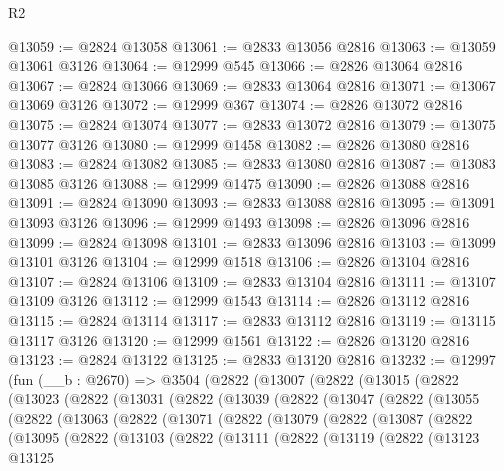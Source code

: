 \begin{lexlean}{R2}
\begin{coremodule}
@13059 := @2824 @13058
@13061 := @2833 @13056 @2816
@13063 := @13059 @13061 @3126
@13064 := @12999 @545
@13066 := @2826 @13064 @2816
@13067 := @2824 @13066
@13069 := @2833 @13064 @2816
@13071 := @13067 @13069 @3126
@13072 := @12999 @367
@13074 := @2826 @13072 @2816
@13075 := @2824 @13074
@13077 := @2833 @13072 @2816
@13079 := @13075 @13077 @3126
@13080 := @12999 @1458
@13082 := @2826 @13080 @2816
@13083 := @2824 @13082
@13085 := @2833 @13080 @2816
@13087 := @13083 @13085 @3126
@13088 := @12999 @1475
@13090 := @2826 @13088 @2816
@13091 := @2824 @13090
@13093 := @2833 @13088 @2816
@13095 := @13091 @13093 @3126
@13096 := @12999 @1493
@13098 := @2826 @13096 @2816
@13099 := @2824 @13098
@13101 := @2833 @13096 @2816
@13103 := @13099 @13101 @3126
@13104 := @12999 @1518
@13106 := @2826 @13104 @2816
@13107 := @2824 @13106
@13109 := @2833 @13104 @2816
@13111 := @13107 @13109 @3126
@13112 := @12999 @1543
@13114 := @2826 @13112 @2816
@13115 := @2824 @13114
@13117 := @2833 @13112 @2816
@13119 := @13115 @13117 @3126
@13120 := @12999 @1561
@13122 := @2826 @13120 @2816
@13123 := @2824 @13122
@13125 := @2833 @13120 @2816
@13232 := @12997
    (fun (__b : @2670) =>
    @3504
      (@2822
        (@13007
          (@2822
            (@13015
              (@2822
                (@13023
                  (@2822
                    (@13031
                      (@2822
                        (@13039
                          (@2822
                            (@13047
                              (@2822
                                (@13055
                                  (@2822
                                    (@13063
                                      (@2822
                                        (@13071
                                          (@2822
                                            (@13079
                                              (@2822
                                                (@13087
                                                  (@2822
                                                    (@13095
                                                      (@2822
                                                        (@13103
                                                          (@2822
                                                            (@13111
                                                              (@2822
                                                                (@13119
                                                                  (@2822
                                                                    (@13123
                                                                      @13125

\end{coremodule}
\end{lexlean}
